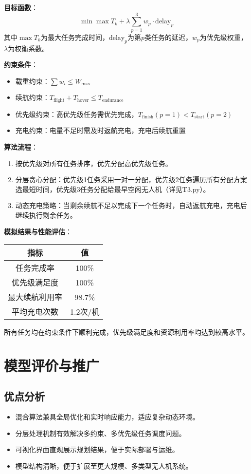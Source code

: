 \documentclass[12pt,fontset=adobe]{ctexart}
\begin{document}
\textbf{目标函数}：
\begin{equation}
  \min \max T_k + \lambda \sum_{p=1}^3 w_p \cdot \text{delay}_p
\end{equation}
其中$\max T_k$为最大任务完成时间，$\text{delay}_p$为第$p$类任务的延迟，$w_p$为优先级权重，$\lambda$为权衡系数。

\textbf{约束条件}：
\begin{itemize}
  \item 载重约束：$\sum w_i \leq W_\text{max}$
  \item 续航约束：$T_\text{flight}+ T_\text{hover}\leq T_\text{endurance}$
  \item 优先级约束：高优先级任务需优先完成，$T_\text{finish}(p=1) < T_\text{start}(p=2)$
  \item 充电约束：电量不足时需及时返航充电，充电后续航重置
\end{itemize}

\textbf{算法流程}：
\begin{enumerate}
  \item 按优先级对所有任务排序，优先分配高优先级任务。
  \item 分层贪心分配：优先级1任务采用一对一分配，优先级2任务遍历所有分配方案选最短时间，优先级3任务分配给最早空闲无人机（详见T3.py）。
  \item 动态充电策略：当剩余续航不足以完成下一个任务时，自动返航充电，充电后继续执行剩余任务。
\end{enumerate}

\textbf{模拟结果与性能评估}：
\begin{tabular}{|c|c|}
  \hline
  指标 & 值 \\
  \hline
  任务完成率 & 100\% \\
  优先级满足度 & 100\% \\
  最大续航利用率 & 98.7\% \\
  平均充电次数 & 1.2次/机 \\
  \hline
\end{tabular}

所有任务均在约束条件下顺利完成，优先级满足度和资源利用率均达到较高水平。

\section{模型评价与推广}

\subsection{优点分析}
\begin{itemize}
  \item 混合算法兼具全局优化和实时响应能力，适应复杂动态环境。
  \item 分层处理机制有效解决多约束、多优先级任务调度问题。
  \item 可视化界面直观展示规划结果，便于实际部署与运维。
  \item 模型结构清晰，便于扩展至更大规模、多类型无人机系统。
\end{itemize}
\end{document}
